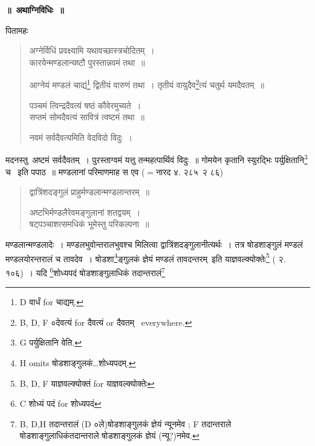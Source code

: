 \documentclass[11pt, openany]{book}
\begin{document}
\newpage
{}

\begin{center}
\textbf{\Large ॥~अथाग्निविधिः~॥}
\end{center}

पितामहः

\begin{quote}
{\vy अग्नेर्विधिं प्रवक्ष्यामि यथावच्छास्त्रचोदितम्~।\\
कारयेन्मण्डलान्यष्टौ पुरस्तान्नवमं तथा~॥ 

आग्नेयं मण्डलं चाद्यं\renewcommand{\thefootnote}{1}\footnote{D वार्धं for चाद्यम्.} द्वितीयं वारुणं तथा~।
तृतीयं वायुदैव\renewcommand{\thefootnote}{2}\footnote{B, D, F ०देवत्यं for दैवत्यं or दैवतम् \textendash\ everywhere.}त्यं चतुर्थ यमदैवतम्~॥

पञ्चमं त्विन्द्रदैवत्यं षष्ठं कौवेरमुच्यते~।\\
सप्तमं सोमदैवत्यं सावित्रं त्वष्टमं तथा~॥

नवमं सर्वदैवत्यमिति वेदविदो विदुः~।}
\end{quote}

मदनस्तु\textendash\ अष्टमं सर्वदैवतम्~। पुरस्ताग्वमं यत्तु तन्महत्पार्थिवं विदुः~॥ गोमयेन कृतानि स्युरद्भिः पर्युक्षितानि\renewcommand{\thefootnote}{3}\footnote{G पर्युक्षितानि वेति.} च \textendash\ इति पपाठ~॥ मण्डलानां परिमाणमाह स एव ($=$नारद ४. २८५\textendash\ २ ८६) 

\begin{quote}
{\vy द्वात्रिंशदङ्गुलं प्राहुर्मण्डलान्मण्डलान्तरम्~॥

अष्टभिर्मण्डलैरेवमङ्गुलानां शतद्वयम्~।\\
षट्पञ्चाशत्समधिकं भूमेस्तु परिकल्पना~॥}
\end{quote}

मण्डलान्मण्डलादेः~। मण्डलभुवोन्तरालभुवश्च मिलित्वा द्वात्रिंशदङ्गुलानीत्यर्थः~। तत्र षोडशाङ्गुलं मण्डलं मण्डलयोरन्तरालं च तावदेव~। षोडशा\renewcommand{\thefootnote}{4}\footnote{H omits षोडशाङ्गुलकं\ldots शोध्यपदम्.}ङ्गुलकं ज्ञेयं मण्डलं तावदन्तरम्\textendash\ इति याज्ञवल्क्योक्तेः\renewcommand{\thefootnote}{5}\footnote{B, D, F याज्ञवल्क्योक्तं for याज्ञवल्क्योक्तेः} ( २. १०६)~। यदि \renewcommand{\thefootnote}{6}\footnote{C शोध्यं पदं for शोध्यपदं}शोध्यपदं षोडशाङ्गुलाधिकं तदान्तरालं\renewcommand{\thefootnote}{7}\footnote{B, D,H तदान्तरालं (D ०ले)षोडशाङ्गुलकं ज्ञेयं न्यूनमेव ; F तदान्तराले षोडशाङ्गुलाधिकंतदान्तराले षोडशाङ्गुलकं ज्ञेयं (न्यू?)नमेव.}

\newpage
\end{document}
